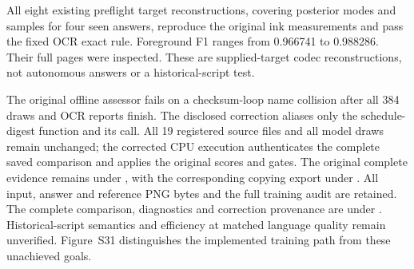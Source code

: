 All eight existing preflight target reconstructions, covering posterior modes
and samples for four seen answers, reproduce the original ink measurements
and pass the fixed OCR exact rule. Foreground F1 ranges from 0.966741 to
0.988286. Their full pages were inspected. These are supplied-target codec
reconstructions, not autonomous answers or a historical-script test.

The original offline assessor fails on a checksum-loop name collision after
all 384 draws and OCR reports finish. The disclosed correction aliases only
the schedule-digest function and its call. All 19 registered source files and
all model draws remain unchanged; the corrected CPU execution authenticates
the complete saved comparison and applies the original scores and gates.
The original complete evidence remains under
, with
the corresponding copying export under
.
All input, answer and reference PNG bytes and the full training audit are retained.
The complete comparison, diagnostics and correction provenance are under
.
Historical-script semantics and efficiency at matched language quality remain
unverified. Figure~S31 distinguishes the implemented training path from these
unachieved goals.


\clearpage
{}
